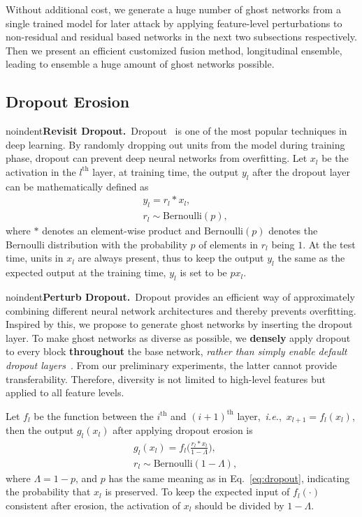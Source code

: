 \documentclass[letterpaper]{article} %
\def\ie{\emph{i.e.}}
\begin{document}
Without additional cost, we generate a huge number of ghost networks from a single trained model for later attack by applying feature-level perturbations to non-residual and residual based networks in the next two subsections respectively.
Then we present an efficient customized fusion method, longitudinal ensemble, leading to ensemble a huge amount of ghost networks possible.

\subsection{Dropout Erosion} \label{sec:dropout}
noindent\textbf{Revisit Dropout.}~Dropout~\cite{srivastava2014dropout} is one of the most popular techniques in deep learning. By randomly dropping out units from the model during training phase, dropout can prevent deep neural networks from overfitting.%
Let $x_l$ be the activation in the $l^\text{th}$ layer, at training time, the output $y_l$ after the dropout layer can be mathematically defined as
\begin{equation} \label{eq:dropout}
\begin{split}
& y_l=r_l*x_l, \\
& r_l\sim\text{Bernoulli}(p),
\end{split}
\end{equation}
where $*$ denotes an element-wise product and $\text{Bernoulli}(p)$ denotes the Bernoulli distribution with the probability $p$ of elements in $r_l$ being $1$. At the test time, units in $x_l$ are always present, thus to keep the output $y_l$ the same as the expected output at the training time, $y_l$ is set to be $p x_l$.

noindent\textbf{Perturb Dropout.}~Dropout provides an efficient way of approximately combining different neural network architectures and thereby prevents overfitting. Inspired by this, we propose to generate ghost networks by inserting the dropout layer. To make ghost networks as diverse as possible, we \textbf{densely} apply dropout to every block \textbf{throughout} the base network, \textit{rather than simply enable default dropout layers~\cite{carlini2017adversarial}}. From our preliminary experiments, the latter cannot provide transferability. Therefore, diversity is not limited to high-level features but applied to all feature levels.%

Let $f_l$ be the function between the $i^\text{th}$ and $(i+1)^\text{th}$ layer,~\ie,~$x_{l+1}=f_l(x_l)$, then the output $g_l(x_l)$ after applying dropout erosion is
\begin{equation} \label{eq:drop-core}
\begin{split}
& g_l(x_l) = f_l\Big(\frac{r_l*x_l}{1-\Lambda}\Big), \\
& r_l\sim\text{Bernoulli}(1-\Lambda),
\end{split}
\end{equation}
where $\Lambda=1-p$, and $p$ has the same meaning as in Eq.~\eqref{eq:dropout}, indicating the probability that $x_l$ is preserved. To keep the expected input of $f_l(\cdot)$ consistent after erosion, the activation of $x_l$ should be divided by $1-\Lambda$.
\end{document}
